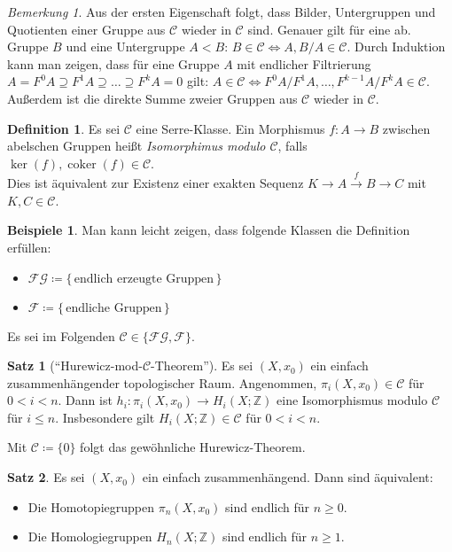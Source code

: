 \documentclass[11pt, a4paper, german]{article}
\theoremstyle{definition}
\newtheorem*{satz}{Satz}
\newtheorem*{defn}{Definition}
\newtheorem*{bspe}{Beispiele}
\theoremstyle{remark}
\newtheorem*{bem}{Bemerkung}
\newcommand{\Z}{\mathbb{Z}} %
\DeclareMathOperator{\coker}{coker} %
\newcommand{\SC}{\mathcal{C}} %
\newcommand{\FG}{\mathcal{FG}} %
\newcommand{\F}{\mathcal{F}} %
\begin{document}
\begin{bem}
  Aus der ersten Eigenschaft folgt, dass Bilder, Untergruppen und Quotienten einer Gruppe aus $\SC$ wieder in $\SC$ sind.
  Genauer gilt für eine ab. Gruppe $B$ und eine Untergruppe $A < B$: $B \in \SC \iff A, B/A \in \SC$.
  Durch Induktion kann man zeigen, dass für eine Gruppe $A$ mit endlicher Filtrierung
  $A = F^0 A \supseteq F^1 A \supseteq \ldots \supseteq F^k A = 0$
  gilt: $A \in \SC \iff F^0 A / F^1 A, \ldots, F^{k-1} A / F^k A \in \SC$.
  Außerdem ist die direkte Summe zweier Gruppen aus $\SC$ wieder in $\SC$.
\end{bem}

\begin{defn}
  Es sei $\SC$ eine Serre-Klasse.
  Ein Morphismus $f : A \to B$ zwischen abelschen Gruppen heißt \emph{Isomorphimus modulo $\SC$}, falls $\ker(f), \coker(f) \in \SC$. \\
  Dies ist äquivalent zur Existenz einer exakten Sequenz $K \to A \xrightarrow{f} B \to C$ mit $K, C \in \SC$.
\end{defn}

\begin{bspe}
  Man kann leicht zeigen, dass folgende Klassen die Definition erfüllen:
  \begin{itemize}
    \item $\FG \coloneqq \{\, \text{endlich erzeugte Gruppen} \,\}$
    \item $\F \coloneqq \{\, \text{endliche Gruppen} \,\}$
  \end{itemize}
\end{bspe}

Es sei im Folgenden $\SC \in \{ \FG, \F \}$.

\begin{satz}["`Hurewicz-mod-$\SC$-Theorem"']
  Es sei $(X, x_0)$ ein einfach zusammenhängender topologischer Raum.
  Angenommen, $\pi_i(X, x_0) \in \SC$ für $0 < i < n$.
  Dann ist $h_i : \pi_i(X, x_0) \to H_i(X; \Z)$ eine Isomorphismus modulo $\SC$ für $i \leq n$.
  Insbesondere gilt $H_i(X; \Z) \in \SC$ für $0 < i < n$.
\end{satz}

Mit $\SC \coloneqq \{ 0 \}$ folgt das gewöhnliche Hurewicz-Theorem.

\begin{satz}
  Es sei $(X, x_0)$ ein einfach zusammenhängend.
  Dann sind äquivalent:
  \begin{itemize}
    \item Die Homotopiegruppen $\pi_n(X, x_0)$ sind endlich für $n \geq 0$.
    \item Die Homologiegruppen $H_n(X; \Z)$ sind endlich für $n \geq 1$.
  \end{itemize}
\end{satz}
\end{document}
